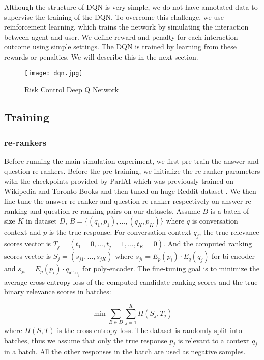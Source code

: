 \documentclass[format=acmsmall, review=False, screen=true]{acmart}
\begin{document}
Although the structure of DQN is very simple, we do not have annotated data to supervise the training of the DQN. To overcome this challenge, we use reinforcement learning, which trains the network by simulating the interaction between agent and user. We define reward and penalty for each interaction outcome using simple settings. The DQN is trained by learning from these rewards or penalties. We will describe this in the next section.


\begin{figure}[h]
  \centering
  \texttt{[image: dqn.jpg]}
  \caption{Risk Control Deep Q Network}
  \label{DQN}
\end{figure}

\subsection{Training}
\subsubsection{\textbf{re-rankers}}
Before running the main simulation experiment, we first pre-train the answer and question re-rankers. Before the pre-training, we initialize the re-ranker parameters with the checkpoints provided by ParlAI which was previously trained on Wikipedia and Toronto Books and then tuned on huge Reddit dataset \cite{redditdataset}. We then fine-tune the answer re-ranker and question re-ranker respectively on answer re-ranking and question re-ranking pairs on our datasets. Assume $B$ is a batch of size $K$ in dataset $D$, $B=\{(q_1,p_1),...,(q_K,p_K)\}$ where $q$ is conversation context and $p$ is the true response. For conversation context $q_j$, the true relevance scores vector is $T_j = (t_1 = 0,...,t_j=1,...,t_K = 0)$. And the computed ranking scores vector is $S_j = (s_{j1},...,s_{jK})$ where $s_{ji} = E_p(p_i)\cdot E_q(q_j)$ for bi-encoder and $s_{ji} = E_p(p_i)\cdot q_{\text{attn}_j}$ for poly-encoder. The fine-tuning goal is to minimize the average cross-entropy loss of the computed candidate ranking scores and the true binary relevance scores in batches:

\begin{equation}
\min \sum_{B\in D} \sum_{j=1}^K H(S_j, T_j)
\end{equation}
where $H(S,T)$ is the cross-entropy loss. The dataset is randomly split into batches, thus we assume that only the true response $p_j$ is relevant to a context $q_j$ in a batch. All the other responses in the batch are used as negative samples.
\end{document}
